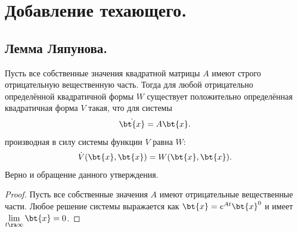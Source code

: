 \section{Добавление техающего.}
\subsection{Лемма Ляпунова.}
\begin{lemma}
    Пусть все собственные значения квадратной матрицы $A$ имеют строго отрицательную вещественную часть.
    Тогда для любой отрицательно определённой квадратичной формы $W$ существует положительно определённая квадратичная форма $V$ такая, что для системы
    \[
        \dot{\bt{x}} = A\bt{x}.
    \]
    производная в силу системы функции $V$ равна $W$:
    \[
        \dot{V}(\bt{x}, \bt{x}) = W(\bt{x}, \bt{x}).
    \]
    Верно и обращение данного утверждения.
\end{lemma}
\begin{proof}
    Пусть все собственные значения $A$ имеют отрицательные вещественные части.
    Любое решение системы выражается как $\bt{x} = e^{At}\bt{x}^0$ и имеет $\lim\limits_{t \ra \infty} \bt{x} = 0$.
\end{proof}